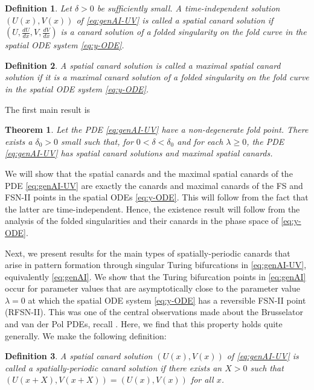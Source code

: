 \documentclass[11pt]{article}
\numberwithin{equation}{section}
\newtheorem{theorem}{Theorem}[section]
\newtheorem{definition}{Definition}[section]
\begin{document}
\begin{definition}
Let $\delta>0$ be sufficiently small.
A time-independent solution $(U(x),V(x))$ of \eqref{eq:genAI-UV} is called
a {\rm spatial canard solution} if $\left(U, \frac{dU}{dx}, V, \frac{dV}{dx} \right)$ is a canard solution
of a folded singularity on the fold curve in the spatial ODE system \eqref{eq:y-ODE}.
\end{definition}
%
\begin{definition}
A spatial canard solution is called a maximal spatial canard solution if it is a maximal canard solution 
of a folded singularity on the fold curve
in the spatial ODE system \eqref{eq:y-ODE}.
\end{definition}
%
The first main result is 
\begin{theorem}\label{thm:1}
    Let the PDE \eqref{eq:genAI-UV} have a non-degenerate fold point.
    There exists a $\delta_0>0$ small such that, for $0<\delta<\delta_0$ and for each $\lambda \ge 0$, the PDE \eqref{eq:genAI-UV} has spatial canard solutions and maximal spatial canards.
\end{theorem}
%
We will show that the spatial canards and the maximal spatial canards of the PDE \eqref{eq:genAI-UV} are exactly the canards and maximal canards of the FS and FSN-II points in the spatial ODEs \eqref{eq:y-ODE}.
This will follow from the fact that the latter are time-independent.
Hence, the existence result will follow from the analysis of the folded singularities and their canards in the phase space of \eqref{eq:y-ODE}.

\medskip

Next, we present results for the main types of spatially-periodic canards that arise in pattern formation through singular Turing bifurcations in \eqref{eq:genAI-UV}, equivalently \eqref{eq:genAI}.
We show that the Turing bifurcation points in \eqref{eq:genAI} occur for parameter values that are asymptotically close to the parameter value $\lambda=0$ at which the spatial ODE system \eqref{eq:y-ODE} has a reversible FSN-II point (RFSN-II).
This was one of the central observations made about the Brusselator and van der Pol PDEs, recall \cite{JDKV2026,VDK2025}.
Here, we find that this property holds quite generally.
We make the following definition:
\begin{definition}
A spatial canard solution $(U(x),V(x))$ of \eqref{eq:genAI-UV} is called
a {\rm spatially-periodic canard solution} if there exists an $X>0$ 
such that $(U(x+X),V(x+X))=(U(x),V(x))$ for all $x$.
\end{definition}
\end{document}
